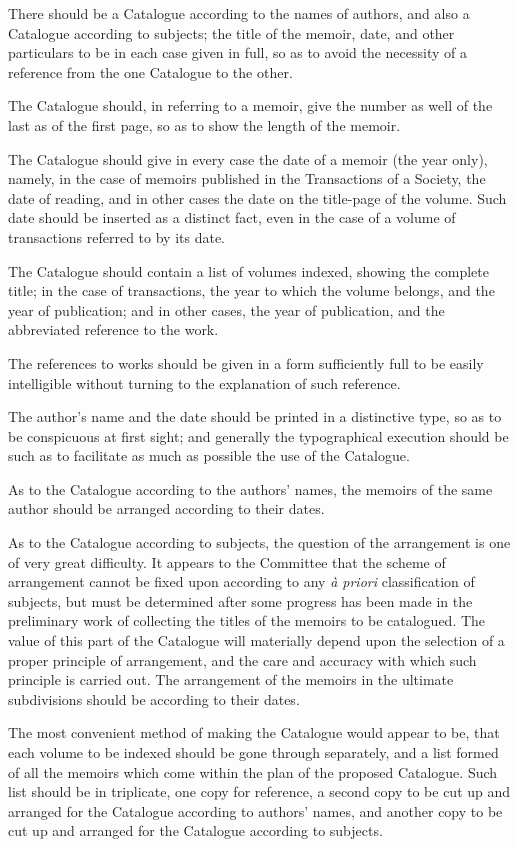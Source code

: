 \documentclass[11pt]{article}
\begin{document}
There should be a Catalogue according to the names of authors, and also a Catalogue according to subjects; the title of the memoir, date, and other particulars to be in each case given in full, so as to avoid the necessity of a reference from the one Catalogue to the other.

The Catalogue should, in referring to a memoir, give the number as well of the last as of the first page, so as to show the length of the memoir.

The Catalogue should give in every case the date of a memoir (the year only), namely, in the case of memoirs published in the Transactions of a Society, the date of reading, and in other cases the date on the title-page of the volume. Such date should be inserted as a distinct fact, even in the case of a volume of transactions referred to by its date.

The Catalogue should contain a list of volumes indexed, showing the complete title; in the case of transactions, the year to which the volume belongs, and the year of publication; and in other cases, the year of publication, and the abbreviated reference to the work.

The references to works should be given in a form sufficiently full to be easily intelligible without turning to the explanation of such reference.

The author's name and the date should be printed in a distinctive type, so as to be conspicuous at first sight; and generally the typographical execution should be such as to facilitate as much as possible the use of the Catalogue.

As to the Catalogue according to the authors' names, the memoirs of the same author should be arranged according to their dates.

As to the Catalogue according to subjects, the question of the arrangement is one of very great difficulty. It appears to the Committee that the scheme of arrangement cannot be fixed upon according to any \emph{\`a priori} classification of subjects, but must be determined after some progress has been made in the preliminary work of collecting the titles of the memoirs to be catalogued. The value of this part of the Catalogue will materially depend upon the selection of a proper principle of arrangement, and the care and accuracy with which such principle is carried out. The arrangement of the memoirs in the ultimate subdivisions should be according to their dates.

The most convenient method of making the Catalogue would appear to be, that each volume to be indexed should be gone through separately, and a list formed of all the memoirs which come within the plan of the proposed Catalogue. Such list should be in triplicate, one copy for reference, a second copy to be cut up and arranged for the Catalogue according to authors' names, and another copy to be cut up and arranged for the Catalogue according to subjects.
\end{document}
